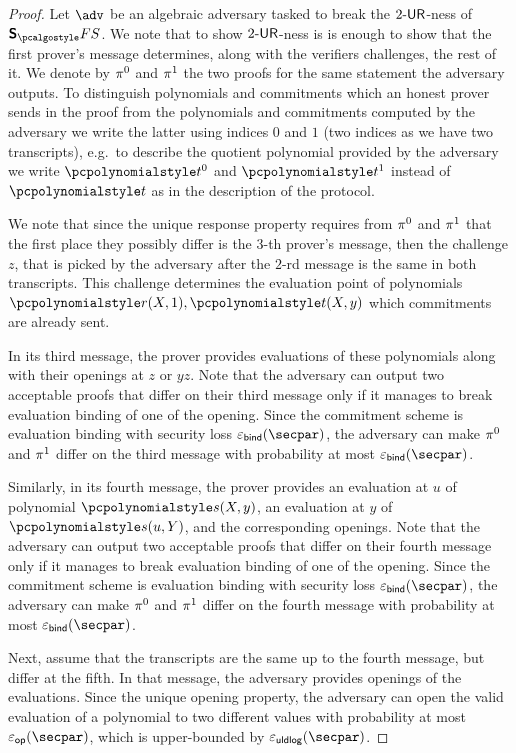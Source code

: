 \begin{proof}
  Let $\adv$ be an algebraic adversary tasked to break the ${2\text{-}\mathsf{UR}}$-ness of
  $\sonicprotfs$. We note that to show ${2\text{-}\mathsf{UR}}$-ness is is enough to show that the first prover's message determines, along with the verifiers challenges, the rest of it. 
  We denote by $\pi^0$ and $\pi^1$ the two proofs for the same statement the adversary outputs.
  To distinguish polynomials and commitments which an honest prover sends in the
  proof from the polynomials and commitments computed by the adversary we write the latter using indices $0$ and $1$ (two indices as we have two transcripts), e.g.~to describe the quotient polynomial provided by the adversary we write $\p{t}^0$ and   $\p{t}^1$ instead of $\p{t}$ as in the description of the protocol.

  We note that since the unique response property requires from $\pi^{0}$ and $\pi^{1}$ that the first place they possibly differ is the $3$-th prover's message, then the challenge $z$, that is picked by the adversary after the $2$-rd message is the same in both transcripts. This challenge determines the evaluation point of polynomials $\p{r}(X, 1), \p{t}(X, y)$ which commitments are already sent.

  In its third message, the prover provides evaluations of these polynomials along with their openings at $z$ or $yz$. Note that the adversary can output two acceptable proofs that differ on their third message only if it  manages to break evaluation binding of one of the opening. Since the commitment scheme is evaluation binding with security loss $\epsbinding (\secpar)$, the adversary can make $\pi^{0}$ and $\pi^{1}$ differ on the third message with probability at most $\epsbinding (\secpar) $. 

  Similarly, in its fourth message, the prover provides an evaluation at $u$ of polynomial $\p{s}(X, y)$, an evaluation at $y$ of $\p{s} (u, Y)$, and the corresponding openings. Note that the adversary can output two acceptable proofs that differ on their fourth message only if it manages to break evaluation binding of one of the opening. Since the commitment scheme is evaluation binding with security loss $\epsbinding (\secpar)$, the adversary can make $\pi^{0}$ and $\pi^{1}$ differ on the fourth message with probability at most $\epsbinding (\secpar) $. 

  Next, assume that the transcripts are the same up to the fourth message, but differ at the fifth. In that message, the adversary provides openings of the evaluations. Since the unique opening property, the adversary can open the valid evaluation of a polynomial to two different values with probability at most $\epsop (\secpar)$, which is upper-bounded by $\epsuldlog (\secpar)$.


\end{proof}
